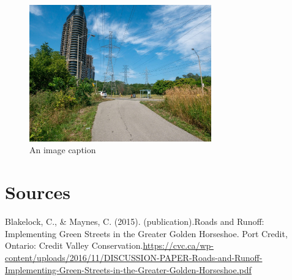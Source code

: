 \documentclass[letter]{ourGreenwayBrand}
\begin{document}
\begin{figure}[htbp]
    \centering
    \includegraphics[width=0.7\textwidth]{images/1220586-2048x1538-1.jpg}
    \caption{An image caption}
    \label{fig:sales}
\end{figure}


\newpage
\section{Sources}

\hspace{1em}Blakelock, C., \& Maynes, C. (2015). (publication).Roads and Runoff: Implementing Green Streets in the Greater Golden Horseshoe. Port Credit, Ontario: Credit Valley Conservation.\url{https://cvc.ca/wp-content/uploads/2016/11/DISCUSSION-PAPER-Roads-and-Runoff-Implementing-Green-Streets-in-the-Greater-Golden-Horseshoe.pdf}
\end{document}
